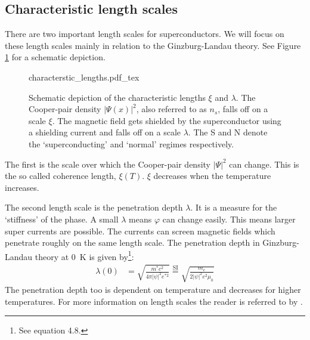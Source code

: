 \subsection{Characteristic length scales}
\label{sec:characteristic-length-scales}
There are two important length scales for superconductors. We will focus on these length scales mainly in relation to the Ginzburg-Landau theory. See Figure \ref{fig:characteristic-lengths} for a schematic depiction.

\begin{figure}[ht!]
	\centering
	\def\svgwidth{\textwidth}
	{characterstic_lengths.pdf_tex}
	\caption{Schematic depiction of the characteristic lengths $\xi$ and $\lambda$. The Cooper-pair density $|\Psi(x)|^2$, also referred to as $n_s$, falls off on a scale $\xi$. The magnetic field gets shielded by the superconductor using a shielding current and falls off on a scale $\lambda$. The S and N denote the `superconducting' and `normal' regimes respectively.}
	\label{fig:characteristic-lengths}
\end{figure}

The first is the scale over which the Cooper-pair density $|\Psi|^2$ can change. This is the so called coherence length, $\xi(T)$. $\xi$ decreases when the temperature increases.\cite{tinkhamIntroductionSuperconductivity}

The second length scale is the penetration depth $\lambda$. It is a measure for the `stiffness' of the phase. A small $\lambda$ means $\varphi$ can change easily. This means larger super currents are possible. The currents can screen magnetic fields which penetrate roughly on the same length scale. The penetration depth in Ginzburg-Landau theory at \qty{0}{\kelvin} is given by\footnote{See  equation 4.8.}:
\begin{align}
	\lambda(0) &= \sqrt{\frac{m^*c^2}{4\pi|\psi|^2e^{*2}}} \stackrel{\text{SI}}{=} \sqrt{\frac{m_e}{2|\psi|^2e^2\mu_0}}
	\label{eqn:london-penetration-depth}
\end{align}
The penetration depth too is dependent on temperature and decreases for higher temperatures. For more information on length scales the reader is referred to  by \citeauthor{tinkhamIntroductionSuperconductivity}.


